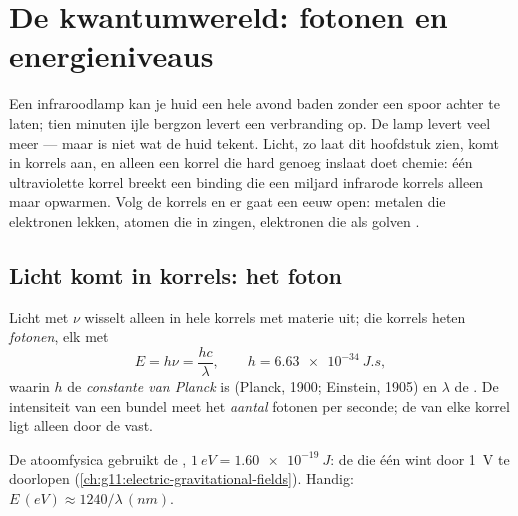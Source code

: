 \chapter{De kwantumwereld: fotonen en energieniveaus}\label{ch:g12:quantum-world}

Een infraroodlamp kan je huid een hele avond baden zonder een spoor achter te
laten; tien minuten ijle bergzon levert een verbranding op. De lamp levert
veel meer  --- maar  is niet wat de huid tekent. Licht, zo laat
dit hoofdstuk zien, komt in korrels aan, en alleen een korrel die hard genoeg
inslaat doet chemie: één ultraviolette korrel breekt een binding die een
miljard infrarode korrels alleen maar opwarmen. Volg de korrels en er gaat een
eeuw open: metalen die elektronen lekken, atomen die in 
zingen, elektronen die als golven .

\section{Licht komt in korrels: het foton}

\begin{definition}\label{def:g12:quantum-world:photon}
Licht met  $\nu$ wisselt alleen in hele korrels  met materie
uit; die korrels heten \emph{fotonen}, elk met 
\[
E = h\nu = \frac{hc}{\lambda}, \qquad h = \qty{6.63e-34}{J.s},
\]
waarin $h$ de \emph{constante van Planck} is
(Planck, 1900; Einstein, 1905) en $\lambda$ de . De
intensiteit van een bundel meet het \emph{aantal} fotonen per seconde; de
 van elke korrel ligt alleen door de  vast.
\end{definition}

\begin{notation}[De elektronvolt]\label{not:g12:quantum-world:ev}
De atoomfysica gebruikt de , $\qty{1}{eV} = \qty{1.60e-19}{J}$:
de  die één  wint door \qty{1}{V} te doorlopen
(\cref{ch:g11:electric-gravitational-fields}). Handig:
$E \,(\unit{eV}) \approx 1240/\lambda\,(\unit{nm})$.
\end{notation}

